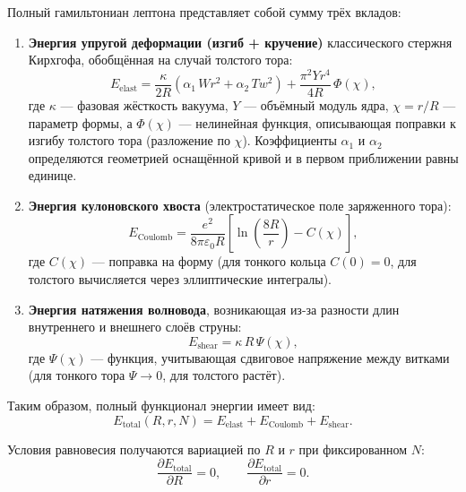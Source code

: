 \documentclass[11pt,a4paper]{article}
\begin{document}
Полный гамильтониан лептона представляет собой сумму трёх вкладов:

\begin{enumerate}
    \item \textbf{Энергия упругой деформации (изгиб + кручение)} классического стержня Кирхгофа, обобщённая на случай толстого тора:
    \begin{equation}
        E_{\text{elast}} = \frac{\kappa}{2R} \left( \alpha_1 \, Wr^2 + \alpha_2 \, Tw^2 \right) + \frac{\pi^2 Y r^4}{4R} \, \Phi(\chi),
    \end{equation}
    где $\kappa$ — фазовая жёсткость вакуума, $Y$ — объёмный модуль ядра, $\chi = r/R$ — параметр формы, а $\Phi(\chi)$ — нелинейная функция, описывающая поправки к изгибу толстого тора (разложение по $\chi$). Коэффициенты $\alpha_1$ и $\alpha_2$ определяются геометрией оснащённой кривой и в первом приближении равны единице.

    \item \textbf{Энергия кулоновского хвоста} (электростатическое поле заряженного тора):
    \begin{equation}
        E_{\text{Coulomb}} = \frac{e^2}{8\pi\varepsilon_0 R} \left[ \ln\left(\frac{8R}{r}\right) - C(\chi) \right],
    \end{equation}
    где $C(\chi)$ — поправка на форму (для тонкого кольца $C(0)=0$, для толстого вычисляется через эллиптические интегралы).

    \item \textbf{Энергия натяжения волновода}, возникающая из-за разности длин внутреннего и внешнего слоёв струны:
    \begin{equation}
        E_{\text{shear}} = \kappa \, R \, \Psi(\chi),
    \end{equation}
    где $\Psi(\chi)$ — функция, учитывающая сдвиговое напряжение между витками (для тонкого тора $\Psi \to 0$, для толстого растёт).
\end{enumerate}

Таким образом, полный функционал энергии имеет вид:
\begin{equation}
    E_{\text{total}}(R, r, N) = E_{\text{elast}} + E_{\text{Coulomb}} + E_{\text{shear}}.
\end{equation}

Условия равновесия получаются вариацией по $R$ и $r$ при фиксированном $N$:
\begin{equation}
    \frac{\partial E_{\text{total}}}{\partial R} = 0, \qquad
    \frac{\partial E_{\text{total}}}{\partial r} = 0.
\end{equation}
\end{document}
